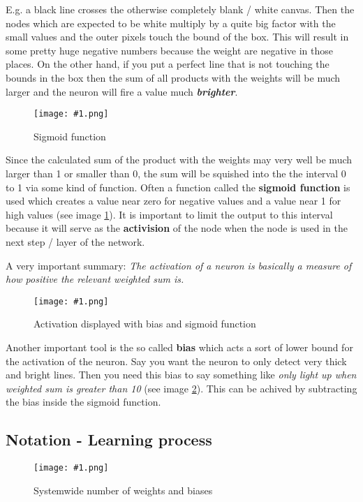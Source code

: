 \documentclass{article}
\newcommand{\lbl}[1]{(see image \ref{#1})}
\newcommand{\img}[1]{
	\centering
	\texttt{[image: \#1.png]}
	\label{#1}
}
\begin{document}
E.g. a black line crosses the otherwise completely blank / white canvas. Then the nodes which are expected to be white multiply by a quite big factor with the small values and the outer pixels touch the bound of the box. This will result in some pretty huge negative numbers because the weight are negative in those places. On the other hand, if you put a perfect line that is not touching the bounds in the box then the sum of all products with the weights will be much larger and the neuron will fire a value much \textit{\textbf{brighter}}.

\begin{figure}[h]
\img{ai_9}
\caption{Sigmoid function}
\end{figure}

Since the calculated sum of the product with the weights may very well be much larger than 1 or smaller than 0, the sum will be squished into the the interval 0 to 1 via some kind of function. Often a function called the \textbf{sigmoid function} is used which creates a value near zero for negative values and a value near 1 for high values \lbl{ai_9}. It is important to limit the output to this interval because it will serve as the \textbf{activision} of the node when the node is used in the next step / layer of the network. 

A very important summary: \textit{The activation of a neuron is basically a measure of how positive the relevant weighted sum is.}


\begin{figure}[h]
\img{ai_10}
\caption{Activation displayed with bias and sigmoid function}
\end{figure}

Another important tool is the so called \textbf{bias} which acts a sort of lower bound for the activation of the neuron. Say you want the neuron to only detect very thick and bright lines. Then you need this bias to say something like \textit{only light up when weighted sum is greater than 10} \lbl{ai_10}. This can be achived by subtracting the bias inside the sigmoid function.



\subsection{Notation - Learning process}

\begin{figure}[!htbp]
\img{ai_11}
\caption{Systemwide number of weights and biases}
\end{figure}
\end{document}

